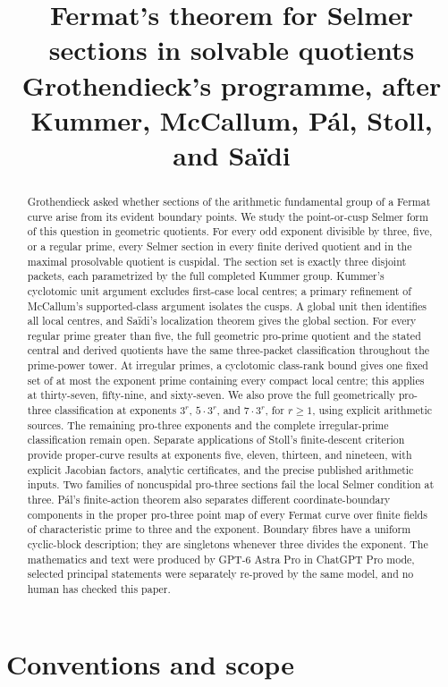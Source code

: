 \documentclass[11pt]{article}
\title{Fermat's theorem for Selmer sections in solvable quotients\\
\large Grothendieck's programme, after Kummer, McCallum, P\'al, Stoll, and Sa\"idi}
\author{}
\date{}
\numberwithin{equation}{section}
\theoremstyle{definition}
\begin{document}
\maketitle
\begin{abstract}
Grothendieck asked whether sections of the arithmetic fundamental group
of a Fermat curve arise from its evident boundary points. We study the
point-or-cusp Selmer form of this question in geometric quotients.
For every odd exponent divisible by three, five, or a regular prime,
every Selmer section in every finite derived quotient and in the maximal
prosolvable quotient is cuspidal. The section set is exactly three
disjoint packets, each parametrized by the full completed Kummer group.
Kummer's cyclotomic unit argument excludes first-case local centres;
a primary refinement of McCallum's supported-class argument isolates
the cusps. A global unit then identifies all local centres, and
Sa\"idi's localization theorem gives the global section.
For every regular prime greater than five, the full geometric
pro-prime quotient and the stated central and derived quotients have
the same three-packet classification throughout the prime-power tower.
At irregular primes, a cyclotomic class-rank bound gives one fixed set
of at most the exponent prime containing every compact local centre;
this applies at thirty-seven, fifty-nine, and sixty-seven.
We also prove the full geometrically pro-three classification at
exponents \(3^r\), \(5\cdot3^r\), and \(7\cdot3^r\), for \(r\ge1\),
using explicit arithmetic sources. The remaining pro-three exponents
and the complete irregular-prime classification remain open.
Separate applications of Stoll's finite-descent criterion provide
proper-curve results at exponents five, eleven, thirteen, and nineteen,
with explicit Jacobian factors, analytic certificates, and the precise
published arithmetic inputs. Two families of noncuspidal pro-three
sections fail the local Selmer condition at three. P\'al's finite-action
theorem also separates different coordinate-boundary components in
the proper pro-three point map of every Fermat curve over finite
fields of characteristic prime to three and the exponent. Boundary
fibres have a uniform cyclic-block description; they are singletons
whenever three divides the exponent.
The mathematics and text were produced by GPT-6 Astra Pro in ChatGPT
Pro mode, selected principal statements were separately re-proved by
the same model, and no human has checked this paper.
\end{abstract}

\section{Conventions and scope}
\end{document}

